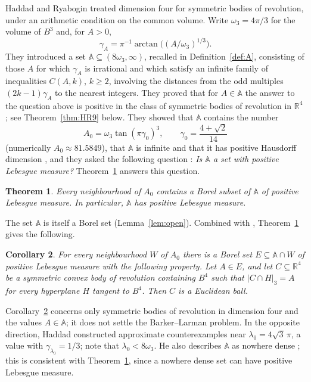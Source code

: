 \documentclass{amsart}
\newtheorem{theorem}{Theorem}[section]
\newtheorem{corollary}[theorem]{Corollary}
\theoremstyle{definition}
\theoremstyle{remark}
\numberwithin{equation}{section}
\newcommand{\R}{\mathbb{R}}
\newcommand{\AAA}{\mathbb{A}}
\newcommand{\meas}[1]{\lvert #1 \rvert}
\begin{document}
Haddad and Ryabogin \cite{HR} treated dimension four for symmetric bodies of revolution, under an arithmetic condition on the common volume. Write $\omega_3=4\pi/3$ for the volume of $B^3$ and, for $A>0$,
\[
\gamma_A=\pi^{-1}\arctan\bigl((A/\omega_3)^{1/3}\bigr).
\]
They introduced a set $\AAA\subseteq(8\omega_3,\infty)$, recalled in Definition~\ref{def:A}, consisting of those $A$ for which $\gamma_A$ is irrational and which satisfy an infinite family of inequalities $C(A,k)$, $k\ge2$, involving the distances from the odd multiples $(2k-1)\gamma_A$ to the nearest integers. They proved that for $A\in\AAA$ the answer to the question above is positive in the class of symmetric bodies of revolution in $\R^4$ \cite[Theorem~9]{HR}; see Theorem~\ref{thm:HR9} below. They showed that $\AAA$ contains the number
\[
A_0=\omega_3\tan(\pi\gamma_0)^3,\qquad \gamma_0=\frac{4+\sqrt2}{14}
\]
(numerically $A_0\approx 81.5849$), that $\AAA$ is infinite and that it has positive Hausdorff dimension \cite[Section~4.2]{HR}, and they asked the following question \cite[Question~15]{HR}: \emph{Is $\AAA$ a set with positive Lebesgue measure?} Theorem~\ref{thm:main} answers this question.

\begin{theorem}\label{thm:main}
Every neighbourhood of $A_0$ contains a Borel subset of $\AAA$ of positive Lebesgue measure. In particular, $\AAA$ has positive Lebesgue measure.
\end{theorem}

The set $\AAA$ is itself a Borel set (Lemma~\ref{lem:open}). Combined with \cite[Theorem~9]{HR}, Theorem~\ref{thm:main} gives the following.

\begin{corollary}\label{cor:geom}
For every neighbourhood $W$ of $A_0$ there is a Borel set $E\subseteq\AAA\cap W$ of positive Lebesgue measure with the following property. Let $A\in E$, and let $C\subseteq\R^4$ be a symmetric convex body of revolution containing $B^4$ such that $\meas{C\cap H}_3=A$ for every hyperplane $H$ tangent to $B^4$. Then $C$ is a Euclidean ball.
\end{corollary}

Corollary~\ref{cor:geom} concerns only symmetric bodies of revolution in dimension four and the values $A\in\AAA$; it does not settle the Barker--Larman problem. In the opposite direction, Haddad \cite{Ha} constructed approximate counterexamples near $\lambda_0=4\sqrt3\,\pi$, a value with $\gamma_{\lambda_0}=1/3$; note that $\lambda_0<8\omega_3$. He also describes $\AAA$ as nowhere dense \cite[Section~1]{Ha}; this is consistent with Theorem~\ref{thm:main}, since a nowhere dense set can have positive Lebesgue measure.
\end{document}
